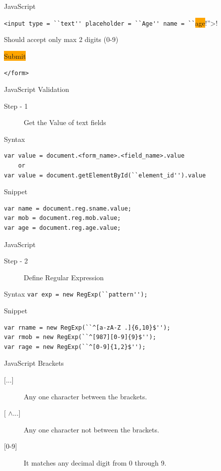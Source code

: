 \documentclass[14pt]{beamer}
\begin{document}
\begin{frame}{JavaScript}
\begin{block}{}
\lstinline!<input type = ``text'' placeholder = ``Age'' name = ``!\colorbox{orange}{age}!''>!
\end{block} 
Should accept only max 2 digits (0-9)
\begin{block}{}
\colorbox{orange}{Submit}

\lstinline!</form>!
\end{block}
\end{frame}

\begin{frame}[fragile]{JavaScript}
Validation
\begin{description}
 \item [Step - 1] Get the Value of text fields
\end{description}
\begin{block}{Syntax}
\begin{lstlisting}
var value = document.<form_name>.<field_name>.value
    or
var value = document.getElementById(``element_id'').value
\end{lstlisting}
\end{block}
\begin{block}{Snippet}
\begin{lstlisting}
var name = document.reg.sname.value;
var mob = document.reg.mob.value;
var age = document.reg.age.value;
\end{lstlisting}
\end{block}
\end{frame}

\begin{frame}[fragile]{JavaScript}
\begin{description}
 \item [Step - 2] Define Regular Expression
\end{description}
\begin{block}{Syntax}
 \lstinline!var exp = new RegExp(``pattern'');!
\end{block}
\begin{block}{Snippet}
\begin{lstlisting}
var rname = new RegExp(``^[a-zA-Z .]{6,10}$'');
var rmob = new RegExp(``^[987][0-9]{9}$'');
var rage = new RegExp(``^[0-9]{1,2}$'');
\end{lstlisting}
\end{block}
\end{frame}

\begin{frame}{JavaScript}
Brackets
\begin{description}
 \item [$\lbrack$...$\rbrack$] Any one character between the brackets.
 \item [$\lbrack$ $\wedge$...$\rbrack$] Any one character not between the brackets.
 \item [$\lbrack$0-9$\rbrack$] It matches any decimal digit from 0 through 9.
\end{description}
\end{frame}
\end{document}
